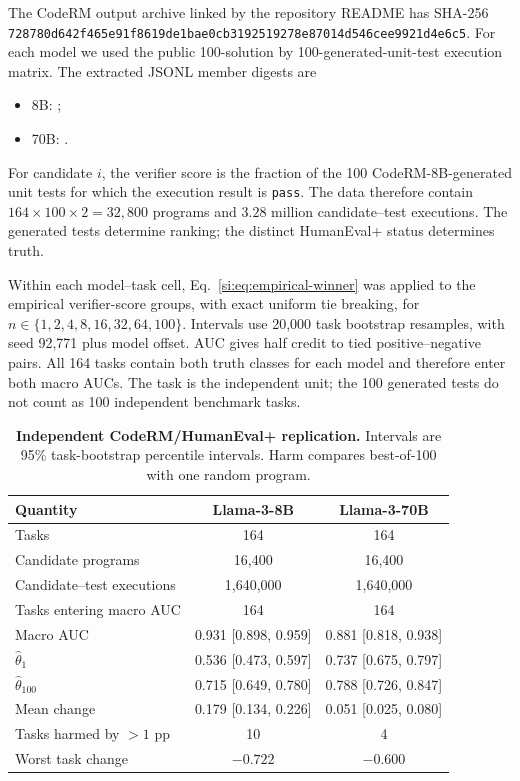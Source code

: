 The CodeRM output archive linked by the repository README has SHA-256
\texttt{728780d642f465e9}\allowbreak\texttt{1f8619de1bae0cb3}\allowbreak\texttt{192519278e87014d}\allowbreak\texttt{546cee9921d4e6c5}. For each model we used the public 100-solution by 100-generated-unit-test execution matrix. The extracted JSONL member digests are
\begin{itemize}
\item 8B: \texttt{};
\item 70B: \texttt{}.
\end{itemize}
For candidate $i$, the verifier score is the fraction of the 100 CodeRM-8B-generated unit tests for which the execution result is \texttt{pass}. The data therefore contain $164\times100\times2=32{,}800$ programs and $3.28$ million candidate--test executions. The generated tests determine ranking; the distinct HumanEval+ status determines truth.

Within each model--task cell, Eq.~\ref{si:eq:empirical-winner} was applied to the empirical verifier-score groups, with exact uniform tie breaking, for $n\in\{1,2,4,8,16,32,64,100\}$. Intervals use 20,000 task bootstrap resamples, with seed 92,771 plus model offset. AUC gives half credit to tied positive--negative pairs. All 164 tasks contain both truth classes for each model and therefore enter both macro AUCs. The task is the independent unit; the 100 generated tests do not count as 100 independent benchmark tasks.

\begin{table}[h]
\centering
\caption{\textbf{Independent CodeRM/HumanEval+ replication.} Intervals are 95\% task-bootstrap percentile intervals. Harm compares best-of-100 with one random program.}
\label{si:tab:coderm-summary}
\begin{tabular}{lcc}
\toprule
Quantity & Llama-3-8B & Llama-3-70B \\
\midrule
Tasks & 164 & 164 \\
Candidate programs & 16,400 & 16,400 \\
Candidate--test executions & 1,640,000 & 1,640,000 \\
Tasks entering macro AUC & 164 & 164 \\
Macro AUC & 0.931 [0.898, 0.959] & 0.881 [0.818, 0.938] \\
$\widehat\theta_1$ & 0.536 [0.473, 0.597] & 0.737 [0.675, 0.797] \\
$\widehat\theta_{100}$ & 0.715 [0.649, 0.780] & 0.788 [0.726, 0.847] \\
Mean change & 0.179 [0.134, 0.226] & 0.051 [0.025, 0.080] \\
Tasks harmed by $>1$ pp & 10 & 4 \\
Worst task change & $-0.722$ & $-0.600$ \\
\bottomrule
\end{tabular}
\end{table}

